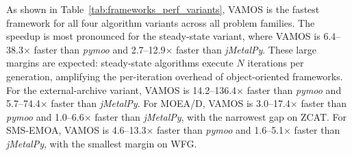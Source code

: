 \documentclass[final,5p,times,twocolumn]{elsarticle}
\newcommand{\VAMOS}{VAMOS}
\begin{document}
As shown in Table~\ref{tab:frameworks_perf_variants}, \VAMOS{} is the fastest framework for all four algorithm variants across all problem families. The speedup is most pronounced for the steady-state variant, where \VAMOS{} is 6.4--38.3$\times$ faster than \textit{pymoo} and 2.7--12.9$\times$ faster than \textit{jMetalPy}. These large margins are expected: steady-state algorithms execute $N$ iterations per generation, amplifying the per-iteration overhead of object-oriented frameworks. For the external-archive variant, \VAMOS{} is 14.2--136.4$\times$ faster than \textit{pymoo} and 5.7--74.4$\times$ faster than \textit{jMetalPy}. For MOEA/D, \VAMOS{} is 3.0--17.4$\times$ faster than \textit{pymoo} and 1.0--6.6$\times$ faster than \textit{jMetalPy}, with the narrowest gap on ZCAT. For SMS-EMOA, \VAMOS{} is 4.6--13.3$\times$ faster than \textit{pymoo} and 1.6--5.1$\times$ faster than \textit{jMetalPy}, with the smallest margin on WFG.


\end{document}
